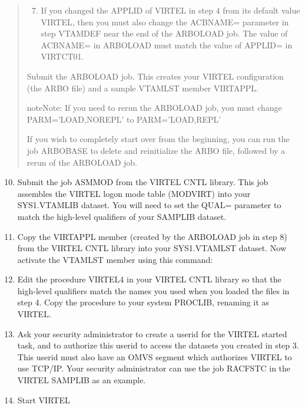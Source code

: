 \documentclass[letterpaper,10pt,english]{sphinxmanual}
\begin{document}
\begin{quote}
\begin{enumerate}
\setcounter{enumi}{6}
\item {} 
If you changed the APPLID of VIRTEL in step 4 from its default value VIRTEL, then you must also change the ACBNAME= parameter in step VTAMDEF near the end of the ARBOLOAD job. The value of ACBNAME= in ARBOLOAD must match the value of APPLID= in VIRTCT01.

\end{enumerate}

Submit the ARBOLOAD job. This creates your VIRTEL configuration (the ARBO file) and a sample VTAMLST member VIRTAPPL.

\begin{sphinxadmonition}{note}{Note:}
If you need to rerun the ARBOLOAD job, you must change PARM=’LOAD,NOREPL’ to PARM=’LOAD,REPL’
\end{sphinxadmonition}

If you wish to completely start over from the beginning, you can run the job ARBOBASE to delete and reinitialize the ARBO file, followed by a rerun of the ARBOLOAD job.
\end{quote}
\begin{enumerate}
\setcounter{enumi}{9}
\item {} 
Submit the job ASMMOD from the VIRTEL CNTL library. This job assembles the VIRTEL logon mode table (MODVIRT) into your SYS1.VTAMLIB dataset. You will need to set the QUAL= parameter to match the high-level qualifiers of your SAMPLIB dataset.

\item {} 
Copy the VIRTAPPL member (created by the ARBOLOAD job in step 8) from the VIRTEL CNTL library into your SYS1.VTAMLST dataset. Now activate the VTAMLST member using this command:

\end{enumerate}

\begin{sphinxVerbatim}[commandchars=\\\{\}]
 
\end{sphinxVerbatim}
\begin{enumerate}
\setcounter{enumi}{11}
\item {} 
Edit the procedure VIRTEL4 in your VIRTEL CNTL library so that the high-level qualifiers match the names you used when you loaded the files in step 4. Copy the procedure to your system PROCLIB, renaming it as VIRTEL.

\item {} 
Ask your security administrator to create a userid for the VIRTEL started task, and to authorize this userid to access the datasets you created in step 3. This userid must also have an OMVS segment which authorizes VIRTEL to use TCP/IP. Your security administrator can use the job RACFSTC in the VIRTEL SAMPLIB as an example.

\item {} 
Start VIRTEL

\end{enumerate}
\end{document}
